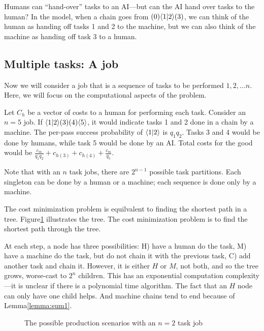 \documentclass{article}
\begin{document}
Humans can ``hand-over'' tasks to an AI---but can the AI hand over tasks to the human?
In the model, when a chain goes from $( 0 )\langle 1|2 \rangle( 3 )$, we can think of the human as handing off tasks 1 and 2 to the machine, but we can also think of the machine as handing off task 3 to a human.

\subsection{Multiple tasks: A job}
Now we will consider a job that is a sequence of tasks to be performed $1, 2, \ldots n$.
Here, we will focus on the computational aspects of the problem.

Let $C_h$ be a vector of costs to a human for performing each task.
Consider an $n = 5$ job. 
If $\langle 1|2 \rangle( 3 )( 4 )\langle 5 \rangle$, it would indicate tasks 1 and 2 done in a chain by a machine.  
The per-pass success probability of $\langle 1|2 \rangle$ is $q_1q_2$. 
Tasks 3 and 4 would be done by humans, while task 5 would be done by an AI. 
Total costs for the good would be $\frac{c_m}{q_1 q_2} + c_{h(3)} + c_{h(4)} + \frac{c_m}{q_5}$.

Note that with an $n$ task jobs, there are $2^{n-1}$ possible task partitions.
Each singleton can be done by a human or a machine; each sequence is done only by a machine.

The cost minimization problem is equilvalent to finding the shortest path in a tree.
Figure\ref{fig:tree} illustrates the tree. 
The cost minimization problem is to find the shortest path through the tree. 

At each step, a node has three possibilities:
H) have a human do the task,
M) have a machine do the task, but do not chain it with the previous task,
C) add another task and chain it.
However, it is either $H$ or $M$, not both, and so the tree grows, worse-cast to $2^n$ children.
This has an exponential computation complexity---it is unclear if there is a polynomial time algorithm.
The fact that an $H$ node can only have one child helps.
And machine chains tend to end because of Lemma\ref{lemma:sum1}.

\begin{figure}
\caption{The possible production scenarios with an $n=2$ task job}
\label{fig:tree}
\end{figure}
\end{document}
